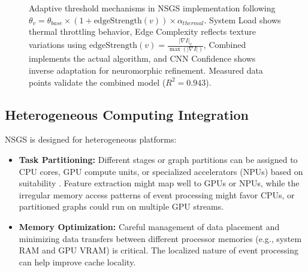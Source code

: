 \documentclass[conference]{IEEEtran}
\begin{document}
\begin{figure}[t]
    \caption{Adaptive threshold mechanisms in NSGS implementation following $\theta_v = \theta_{base} \times (1 + \text{edgeStrength}(v)) \times \alpha_{thermal}$. System Load shows thermal throttling behavior, Edge Complexity reflects texture variations using $\text{edgeStrength}(v) = \frac{|\nabla I|_v}{\max(|\nabla I|)}$, Combined implements the actual algorithm, and CNN Confidence shows inverse adaptation for neuromorphic refinement. Measured data points validate the combined model ($R^2 = 0.943$).}
    \label{fig:threshold-adaptation}
\end{figure}

\subsection{Heterogeneous Computing Integration}

NSGS is designed for heterogeneous platforms:
\begin{itemize}
    \item \textbf{Task Partitioning:} Different stages or graph partitions can be assigned to CPU cores, GPU compute units, or specialized accelerators (NPUs) based on suitability \cite{Davies2018}. Feature extraction might map well to GPUs or NPUs, while the irregular memory access patterns of event processing might favor CPUs, or partitioned graphs could run on multiple GPU streams.
    \item \textbf{Memory Optimization:} Careful management of data placement and minimizing data transfers between different processor memories (e.g., system RAM and GPU VRAM) is critical. The localized nature of event processing can help improve cache locality.
\end{itemize}
\end{document}
